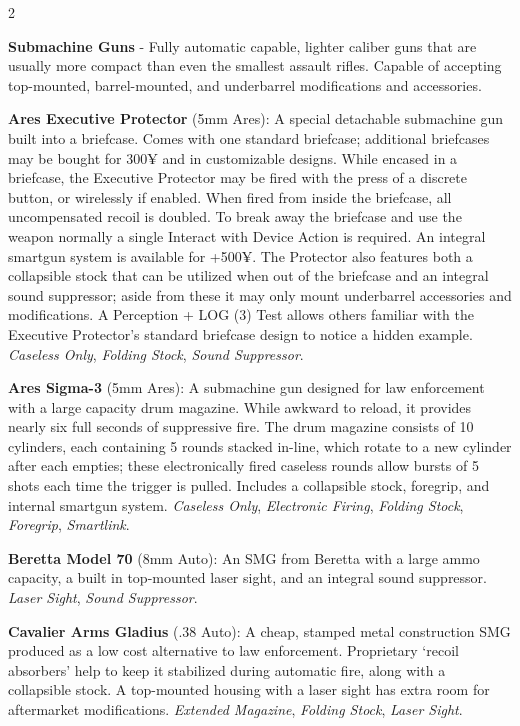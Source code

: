 \documentclass[
  oneside]{article}
\begin{document}
\begin{multicols}{2}

\textbf{Submachine Guns} - Fully automatic
capable, lighter caliber guns that are usually
more compact than even the smallest assault
rifles. Capable of accepting top-mounted,
barrel-mounted, and underbarrel modifications and
accessories.

\textbf{Ares Executive Protector} (5mm Ares): A
special detachable submachine gun built into a
briefcase. Comes with one standard briefcase;
additional briefcases may be bought for 300¥ and
in customizable designs. While encased in a
briefcase, the Executive Protector may be fired
with the press of a discrete button, or wirelessly
if enabled. When fired from inside the briefcase,
all uncompensated recoil is doubled. To break away
the briefcase and use the weapon normally a single
Interact with Device Action is required. An
integral smartgun system is available for +500¥.
The Protector also features both a collapsible
stock that can be utilized when out of the
briefcase and an integral sound suppressor; aside
from these it may only mount underbarrel
accessories and modifications. A Perception + LOG
(3) Test allows others familiar with the Executive
Protector's standard briefcase design to notice a
hidden example. \emph{Caseless Only},
\emph{Folding Stock}, \emph{Sound Suppressor}.

\textbf{Ares Sigma-3} (5mm Ares): A submachine gun
designed for law enforcement with a large capacity
drum magazine. While awkward to reload, it
provides nearly six full seconds of suppressive
fire. The drum magazine consists of 10 cylinders,
each containing 5 rounds stacked in-line, which
rotate to a new cylinder after each empties; these
electronically fired caseless rounds allow bursts
of 5 shots each time the trigger is pulled.
Includes a collapsible stock, foregrip, and
internal smartgun system. \emph{Caseless Only},
\emph{Electronic Firing}, \emph{Folding Stock},
\emph{Foregrip}, \emph{Smartlink}.

\textbf{Beretta Model 70} (8mm Auto): An SMG from
Beretta with a large ammo capacity, a built in
top-mounted laser sight, and an integral sound
suppressor. \emph{Laser Sight}, \emph{Sound
Suppressor}.

\textbf{Cavalier Arms Gladius} (.38 Auto): A
cheap, stamped metal construction SMG produced as
a low cost alternative to law enforcement.
Proprietary `recoil absorbers' help to keep it
stabilized during automatic fire, along with a
collapsible stock. A top-mounted housing with a
laser sight has extra room for aftermarket
modifications. \emph{Extended Magazine},
\emph{Folding Stock}, \emph{Laser Sight}.


\end{multicols}
\end{document}
